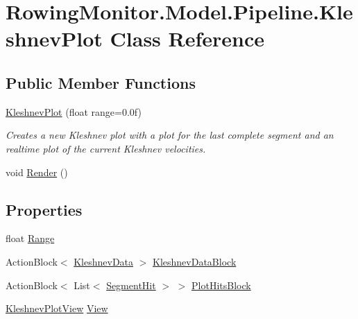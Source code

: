 \hypertarget{class_rowing_monitor_1_1_model_1_1_pipeline_1_1_kleshnev_plot}{}\section{Rowing\+Monitor.\+Model.\+Pipeline.\+Kleshnev\+Plot Class Reference}
\label{class_rowing_monitor_1_1_model_1_1_pipeline_1_1_kleshnev_plot}
\subsection*{Public Member Functions}
\begin{DoxyCompactItemize}
\item 
\hyperlink{class_rowing_monitor_1_1_model_1_1_pipeline_1_1_kleshnev_plot_a892c72567b10ca5cd3ef48b4ad9adb6e}{Kleshnev\+Plot} (float range=0.\+0f)
\begin{DoxyCompactList}\small\item\em Creates a new Kleshnev plot with a plot for the last complete segment and an realtime plot of the current Kleshnev velocities. \end{DoxyCompactList}\item 
void \hyperlink{class_rowing_monitor_1_1_model_1_1_pipeline_1_1_kleshnev_plot_a879f9fed320882b414bee01067dbe904}{Render} ()
\end{DoxyCompactItemize}
\subsection*{Properties}
\begin{DoxyCompactItemize}
\item 
float \hyperlink{class_rowing_monitor_1_1_model_1_1_pipeline_1_1_kleshnev_plot_a207085f1a6dc22991a7f8bf6a0452cb8}{Range}
\item 
Action\+Block$<$ \hyperlink{struct_rowing_monitor_1_1_model_1_1_pipeline_1_1_kleshnev_data}{Kleshnev\+Data} $>$ \hyperlink{class_rowing_monitor_1_1_model_1_1_pipeline_1_1_kleshnev_plot_af3a6e1668ca2bd06362f6849dbd1dd3d}{Kleshnev\+Data\+Block}
\item 
Action\+Block$<$ List$<$ \hyperlink{struct_rowing_monitor_1_1_model_1_1_util_1_1_segment_hit}{Segment\+Hit} $>$ $>$ \hyperlink{class_rowing_monitor_1_1_model_1_1_pipeline_1_1_kleshnev_plot_a59b2751dcbac682302c7dff7f404f8e0}{Plot\+Hits\+Block}
\item 
\hyperlink{class_rowing_monitor_1_1_view_1_1_kleshnev_plot_view}{Kleshnev\+Plot\+View} \hyperlink{class_rowing_monitor_1_1_model_1_1_pipeline_1_1_kleshnev_plot_a154ed82243dd60d53794d7aa2eaed202}{View}
\end{DoxyCompactItemize}


